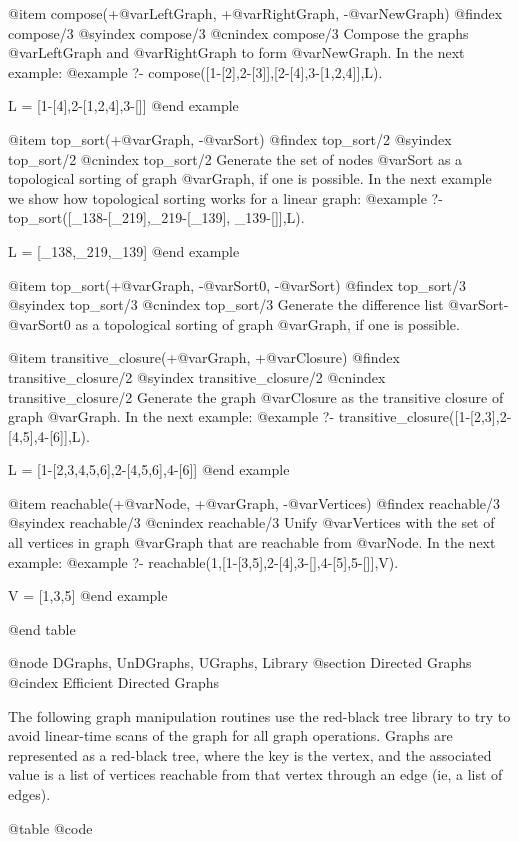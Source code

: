 {{{{{{{{@item compose(+@var{LeftGraph}, +@var{RightGraph}, -@var{NewGraph})
@findex  compose/3
@syindex compose/3
@cnindex compose/3
Compose the graphs @var{LeftGraph} and @var{RightGraph} to form @var{NewGraph}.
 In the next example:
@example
?- compose([1-[2],2-[3]],[2-[4],3-[1,2,4]],L).

L = [1-[4],2-[1,2,4],3-[]]
@end example

@item top_sort(+@var{Graph}, -@var{Sort})
@findex  top_sort/2
@syindex top_sort/2
@cnindex top_sort/2
Generate the set of nodes @var{Sort} as a topological sorting of graph
@var{Graph}, if one is possible.
 In the next example we show how topological sorting works for a linear graph:
@example
?- top_sort([_138-[_219],_219-[_139], _139-[]],L).

L = [_138,_219,_139]
@end example

@item top_sort(+@var{Graph}, -@var{Sort0}, -@var{Sort})
@findex  top_sort/3
@syindex top_sort/3
@cnindex top_sort/3
Generate the difference list @var{Sort}-@var{Sort0} as a topological
sorting of graph @var{Graph}, if one is possible.

@item transitive_closure(+@var{Graph}, +@var{Closure})
@findex  transitive_closure/2
@syindex transitive_closure/2
@cnindex transitive_closure/2
Generate the graph @var{Closure} as the transitive closure of graph
@var{Graph}.
 In the next example:
@example
?- transitive_closure([1-[2,3],2-[4,5],4-[6]],L).

L = [1-[2,3,4,5,6],2-[4,5,6],4-[6]]
@end example

@item reachable(+@var{Node}, +@var{Graph}, -@var{Vertices})
@findex  reachable/3
@syindex reachable/3
@cnindex reachable/3
Unify @var{Vertices} with the set of all vertices in graph
@var{Graph} that are reachable from @var{Node}. In the next example:
@example
?- reachable(1,[1-[3,5],2-[4],3-[],4-[5],5-[]],V).

V = [1,3,5]
@end example

@end table

@node DGraphs, UnDGraphs, UGraphs, Library
@section Directed Graphs
@cindex Efficient Directed Graphs

The following graph manipulation routines use the red-black tree library
to try to avoid linear-time scans of the graph for all graph
operations. Graphs are represented as a red-black tree, where the key is
the vertex, and the associated value is a list of vertices reachable
from that vertex through an edge (ie, a list of edges). 

@table @code

}}}}}}}}
